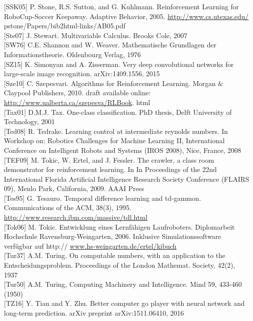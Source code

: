 \documentclass[10pt]{article}
\begin{document}
[SSK05] P. Stone, R.S. Sutton, and G. Kuhlmann. Reinforcement Learning for RoboCup-Soccer Keepaway. Adaptive Behavior, 2005. \href{http://www.cs.utexas.edu/}{http://www.cs.utexas.edu/} pstone/Papers/bib2html-links/AB05.pdf\\[0pt]
[Ste07] J. Stewart. Multivariable Calculus. Brooks Cole, 2007\\[0pt]
[SW76] C.E. Shannon and W. Weaver. Mathematische Grundlagen der Informationstheorie. Oldenbourg Verlag, 1976\\[0pt]
[SZ15] K. Simonyan and A. Zisserman. Very deep convolutional networks for large-scale image recognition. arXiv:1409.1556, 2015\\[0pt]
[Sze10] C. Szepesvari. Algorithms for Reinforcement Learning. Morgan \& Claypool Publishers, 2010. draft available online: \href{http://www.ualberta.ca/szepesva/RLBook}{http://www.ualberta.ca/szepesva/RLBook}. html\\[0pt]
[Tax01] D.M.J. Tax. One-class classification. PhD thesis, Delft University of Technology, 2001\\[0pt]
[Ted08] R. Tedrake. Learning control at intermediate reynolds numbers. In Workshop on: Robotics Challenges for Machine Learning II, International Conference on Intelligent Robots and Systems (IROS 2008), Nice, France, 2008\\[0pt]
[TEF09] M. Tokic, W. Ertel, and J. Fessler. The crawler, a class room demonstrator for reinforcement learning. In In Proceedings of the 22nd International Florida Artificial Intelligence Research Society Conference (FLAIRS 09), Menlo Park, California, 2009. AAAI Press\\[0pt]
[Tes95] G. Tesauro. Temporal difference learning and td-gammon. Communications of the ACM, 38(3), 1995. \href{http://www.research.ibm.com/massive/tdl.html}{http://www.research.ibm.com/massive/tdl.html}\\[0pt]
[Tok06] M. Tokic. Entwicklung eines Lernfähigen Laufroboters. Diplomarbeit Hochschule Ravensburg-Weingarten, 2006. Inklusive Simulationssoftware verfügbar auf http:// \href{http://www.hs-weingarten.de/ertel/kibuch}{www.hs-weingarten.de/ertel/kibuch}\\[0pt]
[Tur37] A.M. Turing. On computable numbers, with an application to the Entscheidungsproblem. Proceedings of the London Mathemat. Society, 42(2), 1937\\[0pt]
[Tur50] A.M. Turing, Computing Machinery and Intelligence. Mind 59, 433-460 (1950)\\[0pt]
[TZ16] Y. Tian and Y. Zhu. Better computer go player with neural network and long-term prediction. arXiv preprint arXiv:1511.06410, 2016\\[0pt]
\end{document}
